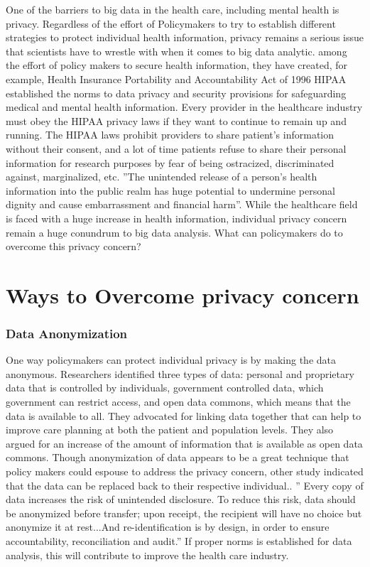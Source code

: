 \documentclass[sigconf]{acmart}
\begin{document}
One of the barriers to big data in the health care, including mental health is privacy. Regardless of the effort of Policymakers to try to establish different strategies to protect individual health information, privacy remains a serious issue that scientists have to wrestle with when it comes to big data analytic. among the effort of policy makers to secure health information, they have created, for example, Health Insurance Portability and Accountability Act of 1996 HIPAA established the norms to data privacy and security provisions for safeguarding medical and mental health information. Every provider in the healthcare industry must obey the HIPAA privacy laws if they want to continue to remain up and running. The HIPAA laws prohibit providers to share patient's information without their consent, and a lot of time patients refuse to share their personal information for research purposes by fear of being ostracized, discriminated against, marginalized, etc. ''The unintended release of a person’s health information into the public realm has huge potential to undermine personal dignity and cause embarrassment and financial harm''\cite{van2011health}. While the healthcare field is faced with a huge increase in health information, individual privacy concern remain a huge conundrum to big data analysis. What can policymakers do to overcome this privacy concern?

\section{Ways to Overcome privacy concern}
\subsubsection{Data Anonymization}
One way policymakers can protect individual privacy is by making the data anonymous. Researchers identified three types of data: personal and proprietary data that is controlled by individuals, government controlled data, which government can restrict access, and open data commons, which means that the data is available to all. They advocated for linking data together that can help to improve care planning at both the patient and population levels. They also argued for an increase of the amount of information that is available as open data commons. Though anonymization of data appears to be a great technique that policy makers could espouse to address the privacy concern, other study indicated that the data can be replaced back to their respective individual.\cite{van2011health}. '' Every copy of data increases the risk of unintended disclosure. To reduce this risk, data should be anonymized before transfer; upon receipt, the recipient will have no choice but anonymize it at rest...And re-identification is by design, in order to ensure accountability, reconciliation and audit.'' If proper norms is established for data analysis, this will contribute to improve the health care industry. 
\end{document}

